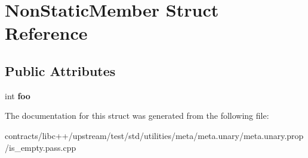 \hypertarget{struct_non_static_member}{}\section{Non\+Static\+Member Struct Reference}
\label{struct_non_static_member}
\subsection*{Public Attributes}
\begin{DoxyCompactItemize}
\item 
\mbox{\label{struct_non_static_member_a3b8f35173c85d109f443af751b1e8626}} 
int {\bfseries foo}
\end{DoxyCompactItemize}


The documentation for this struct was generated from the following file\+:\begin{DoxyCompactItemize}
\item 
contracts/libc++/upstream/test/std/utilities/meta/meta.\+unary/meta.\+unary.\+prop/is\+\_\+empty.\+pass.\+cpp\end{DoxyCompactItemize}
